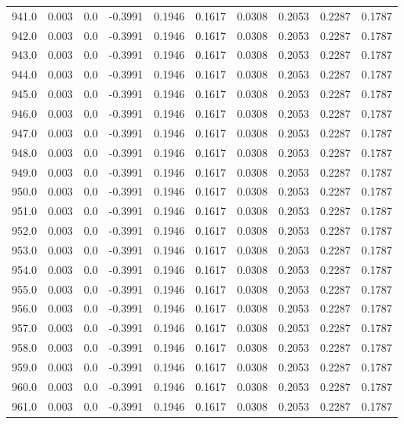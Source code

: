 \begin{longtable}{lrrrrrrrrr}
941.0 & 0.003 & 0.0 & -0.3991 & 0.1946 & 0.1617 & 0.0308 & 0.2053 & 0.2287 & 0.1787 \\
942.0 & 0.003 & 0.0 & -0.3991 & 0.1946 & 0.1617 & 0.0308 & 0.2053 & 0.2287 & 0.1787 \\
943.0 & 0.003 & 0.0 & -0.3991 & 0.1946 & 0.1617 & 0.0308 & 0.2053 & 0.2287 & 0.1787 \\
944.0 & 0.003 & 0.0 & -0.3991 & 0.1946 & 0.1617 & 0.0308 & 0.2053 & 0.2287 & 0.1787 \\
945.0 & 0.003 & 0.0 & -0.3991 & 0.1946 & 0.1617 & 0.0308 & 0.2053 & 0.2287 & 0.1787 \\
946.0 & 0.003 & 0.0 & -0.3991 & 0.1946 & 0.1617 & 0.0308 & 0.2053 & 0.2287 & 0.1787 \\
947.0 & 0.003 & 0.0 & -0.3991 & 0.1946 & 0.1617 & 0.0308 & 0.2053 & 0.2287 & 0.1787 \\
948.0 & 0.003 & 0.0 & -0.3991 & 0.1946 & 0.1617 & 0.0308 & 0.2053 & 0.2287 & 0.1787 \\
949.0 & 0.003 & 0.0 & -0.3991 & 0.1946 & 0.1617 & 0.0308 & 0.2053 & 0.2287 & 0.1787 \\
950.0 & 0.003 & 0.0 & -0.3991 & 0.1946 & 0.1617 & 0.0308 & 0.2053 & 0.2287 & 0.1787 \\
951.0 & 0.003 & 0.0 & -0.3991 & 0.1946 & 0.1617 & 0.0308 & 0.2053 & 0.2287 & 0.1787 \\
952.0 & 0.003 & 0.0 & -0.3991 & 0.1946 & 0.1617 & 0.0308 & 0.2053 & 0.2287 & 0.1787 \\
953.0 & 0.003 & 0.0 & -0.3991 & 0.1946 & 0.1617 & 0.0308 & 0.2053 & 0.2287 & 0.1787 \\
954.0 & 0.003 & 0.0 & -0.3991 & 0.1946 & 0.1617 & 0.0308 & 0.2053 & 0.2287 & 0.1787 \\
955.0 & 0.003 & 0.0 & -0.3991 & 0.1946 & 0.1617 & 0.0308 & 0.2053 & 0.2287 & 0.1787 \\
956.0 & 0.003 & 0.0 & -0.3991 & 0.1946 & 0.1617 & 0.0308 & 0.2053 & 0.2287 & 0.1787 \\
957.0 & 0.003 & 0.0 & -0.3991 & 0.1946 & 0.1617 & 0.0308 & 0.2053 & 0.2287 & 0.1787 \\
958.0 & 0.003 & 0.0 & -0.3991 & 0.1946 & 0.1617 & 0.0308 & 0.2053 & 0.2287 & 0.1787 \\
959.0 & 0.003 & 0.0 & -0.3991 & 0.1946 & 0.1617 & 0.0308 & 0.2053 & 0.2287 & 0.1787 \\
960.0 & 0.003 & 0.0 & -0.3991 & 0.1946 & 0.1617 & 0.0308 & 0.2053 & 0.2287 & 0.1787 \\
961.0 & 0.003 & 0.0 & -0.3991 & 0.1946 & 0.1617 & 0.0308 & 0.2053 & 0.2287 & 0.1787 \\

\end{longtable}

